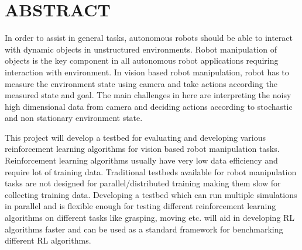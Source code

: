 \newpage
{}
\chapter*{\MakeUppercase{Abstract}}
In order to assist in general tasks, autonomous robots should be able to interact with dynamic objects in unstructured environments. Robot manipulation of objects is the key component in all autonomous robot applications requiring interaction with environment. In vision based robot manipulation, robot has to measure the environment state using camera and take actions according the measured state and goal. The main challenges in here are interpreting the noisy high dimensional data from camera and deciding actions according to stochastic and non stationary environment state.

This project will develop a testbed for evaluating and developing various reinforcement learning algorithms for vision based robot manipulation tasks. Reinforcement learning algorithms usually have very low data efficiency and require lot of training data. Traditional testbeds available for robot manipulation tasks are not designed for parallel/distributed training making them slow for collecting training data. Developing a testbed which can run multiple simulations in parallel and is flexible enough for testing different reinforcement learning algorithms on different tasks like grasping, moving etc. will aid in developing RL algorithms faster and can be used as a standard framework for benchmarking different RL algorithms. 
